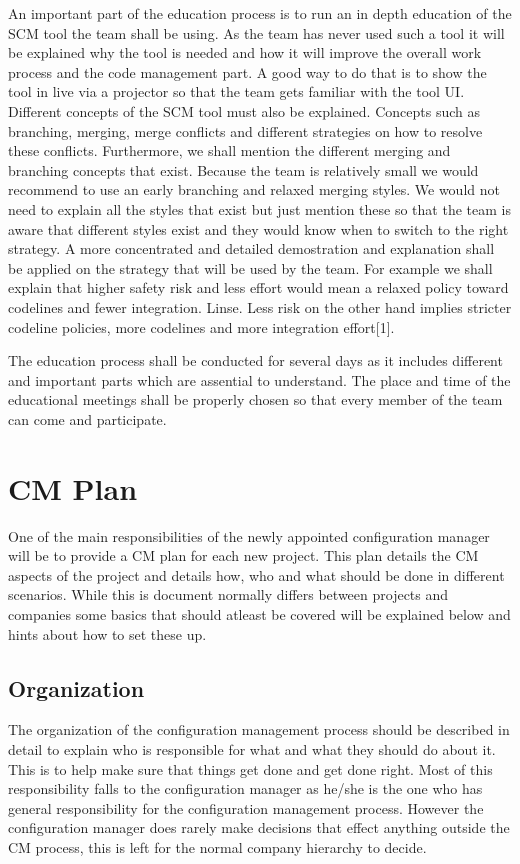 \documentclass[a4paper]{article}
\begin{document}
An important part of the education process is to run an in depth education of the SCM tool the team shall be using. As the team has never used such a tool it will be explained why the tool is needed and how it will improve the overall work process and the code management part. A good way to do that is to show the tool in live via a projector so that the team gets familiar with the tool UI. Different concepts of the SCM tool must also be explained. Concepts such as branching, merging, merge conflicts and different strategies on how to resolve these conflicts. Furthermore, we shall mention the different merging and branching concepts that exist. Because the team is relatively small we would recommend to use an early branching and relaxed merging styles. We would not need to explain all the styles that exist but just mention these so that the team is aware that different styles exist and they would know when to switch to the right strategy. A more concentrated and detailed demostration and explanation shall be applied on the strategy that will be used by the team. For example we shall explain that higher safety risk and less effort would mean a relaxed policy toward codelines and fewer integration. Linse. Less risk on the other hand implies stricter codeline policies, more codelines and more integration effort[1].

The education process shall be conducted for several days as it includes different and important parts which are assential to understand. The place and time of the educational meetings shall be properly chosen so that every member of the team can come and participate.


\section{CM Plan}
One of the main responsibilities of the newly appointed configuration manager will be to provide a CM plan for each new project. This plan details the CM aspects of the project and details how, who and what should be done in different scenarios. While this is document normally differs between projects and companies some basics that should atleast be covered will be explained below and hints about how to set these up. 

\subsection{Organization}
The organization of the configuration management process should be described in detail to explain who is responsible for what and what they should do about it. This is to help make sure that things get done and get done right. Most of this responsibility falls to the configuration manager as he/she is the one who has general responsibility for the configuration management process. However the configuration manager does rarely make decisions that effect anything outside the CM process, this is left for the normal company hierarchy to decide.
\end{document}
